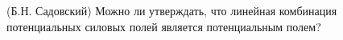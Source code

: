 (Б.Н. Садовский)
Можно ли утверждать, что линейная комбинация потенциальных силовых полей
является потенциальным полем?
